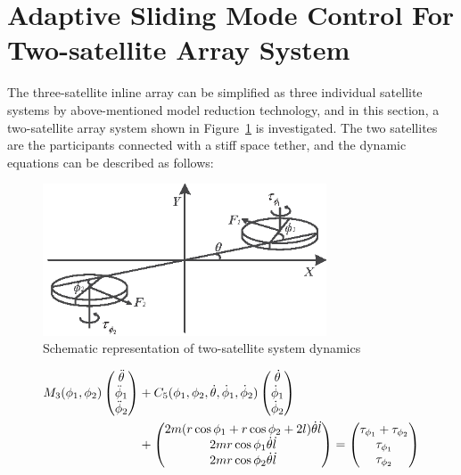 \section{Adaptive Sliding Mode Control For Two-satellite Array System}\label{sec:SMC2}
The three-satellite inline array can be simplified as three individual satellite systems by above-mentioned model reduction technology, and in this section, a two-satellite array system shown in Figure~\ref{Figure:model2body} is investigated. The two satellites are the participants connected with a stiff space tether, and the dynamic equations can be described as follows:
\begin{figure}
\centering
\includegraphics[width=0.75\textwidth]{paper2_Fig4.eps}
\caption{Schematic representation of two-satellite system dynamics}
\label{Figure:model2body}
\end{figure}
\begin{align}
M_3(\phi_1,\phi_2)
\begin{pmatrix}
\ddot{\theta}\\
\ddot{\phi}_1\\
\ddot{\phi}_2
\end{pmatrix}
&+C_5(\phi_1,\phi_2,\dot{\theta},\dot{\phi}_1,\dot{\phi}_2)
\begin{pmatrix}
\dot{\theta}\\
\dot{\phi}_1\\
\dot{\phi}_2
\end{pmatrix}\notag\\
&+
\begin{pmatrix}
2m(r\cos\phi_1+r\cos\phi_2+2l)\dot\theta\dot l\\
2mr\cos\phi_1\dot\theta\dot l\\
2mr\cos\phi_2\dot\theta\dot l
\end{pmatrix}
=
\begin{pmatrix}
\tau_{\phi_1}+\tau_{\phi_2}\\
\tau_{\phi_1}\\
\tau_{\phi_2}
\end{pmatrix}\label{eq:2body}
\end{align}
